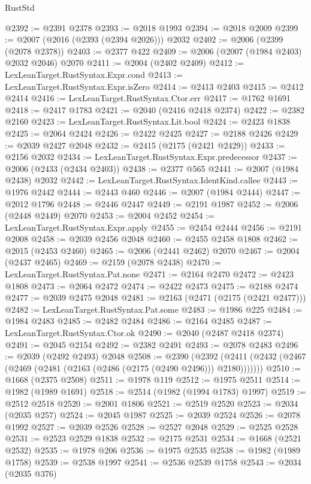 \begin{lexlean}{RustStd}
\begin{coremodule}
@2392 := @2391 @2378
@2393 := @2018 @1993
@2394 := @2018 @2009
@2399 := @2007 (@2016 (@2393 (@2394 @2026))) @2032
@2402 := @2006 (@2399 (@2078 @2378))
@2403 := @2377 @422
@2409 := @2006 (@2007 (@1984 @2403) @2032 @2046) @2070
@2411 := @2004 (@2402 @2409)
@2412 := LexLeanTarget.RustSyntax.Expr.cond
@2413 := LexLeanTarget.RustSyntax.Expr.isZero
@2414 := @2413 @2403
@2415 := @2412 @2414
@2416 := LexLeanTarget.RustSyntax.Ctor.err
@2417 := @1762 @1691
@2418 := @2417 @1783
@2421 := @2040 (@2416 @2418 @2374)
@2422 := @2382 @2160
@2423 := LexLeanTarget.RustSyntax.Lit.bool
@2424 := @2423 @1838
@2425 := @2064 @2424
@2426 := @2422 @2425
@2427 := @2188 @2426
@2429 := @2039 @2427 @2048
@2432 := @2415 (@2175 (@2421 @2429))
@2433 := @2156 @2032
@2434 := LexLeanTarget.RustSyntax.Expr.predecessor
@2437 := @2006 (@2433 (@2434 @2403))
@2438 := @2377 @565
@2441 := @2007 (@1984 @2438) @2032
@2442 := LexLeanTarget.RustSyntax.IdentKind.callee
@2443 := @1976 @2442
@2444 := @2443 @460
@2446 := @2007 (@1984 @2444)
@2447 := @2012 @1796
@2448 := @2446 @2447
@2449 := @2191 @1987
@2452 := @2006 (@2448 @2449) @2070
@2453 := @2004 @2452
@2454 := LexLeanTarget.RustSyntax.Expr.apply
@2455 := @2454 @2444
@2456 := @2191 @2008
@2458 := @2039 @2456 @2048
@2460 := @2455 @2458 @1808
@2462 := @2015 (@2453 @2460)
@2465 := @2006 (@2441 @2462) @2070
@2467 := @2004 (@2437 @2465)
@2469 := @2159 (@2078 @2438)
@2470 := LexLeanTarget.RustSyntax.Pat.none
@2471 := @2164 @2470
@2472 := @2423 @1808
@2473 := @2064 @2472
@2474 := @2422 @2473
@2475 := @2188 @2474
@2477 := @2039 @2475 @2048
@2481 := @2163 (@2471 (@2175 (@2421 @2477)))
@2482 := LexLeanTarget.RustSyntax.Pat.some
@2483 := @1986 @225
@2484 := @1984 @2483
@2485 := @2482 @2484
@2486 := @2164 @2485
@2487 := LexLeanTarget.RustSyntax.Ctor.ok
@2490 := @2040 (@2487 @2418 @2374)
@2491 := @2045 @2154
@2492 := @2382 @2491
@2493 := @2078 @2483
@2496 := @2039 (@2492 @2493) @2048
@2508 := @2390
    (@2392 (@2411 (@2432 (@2467 (@2469 (@2481 (@2163 (@2486 (@2175 (@2490 @2496))) @2180)))))))
@2510 := @1668 (@2375 @2508)
@2511 := @1978 @119
@2512 := @1975 @2511
@2514 := @1982 (@1989 @1691)
@2518 := @2514 (@1982 (@1994 @1783) @1997)
@2519 := @2512 @2518
@2520 := @2001 @1806
@2521 := @2519 @2520
@2523 := @2034 (@2035 @257)
@2524 := @2045 @1987
@2525 := @2039 @2524
@2526 := @2078 @1992
@2527 := @2039 @2526
@2528 := @2527 @2048
@2529 := @2525 @2528
@2531 := @2523 @2529 @1838
@2532 := @2175 @2531
@2534 := @1668 (@2521 @2532)
@2535 := @1978 @206
@2536 := @1975 @2535
@2538 := @1982 (@1989 @1758)
@2539 := @2538 @1997
@2541 := @2536 @2539 @1758
@2543 := @2034 (@2035 @376)

\end{coremodule}
\end{lexlean}
